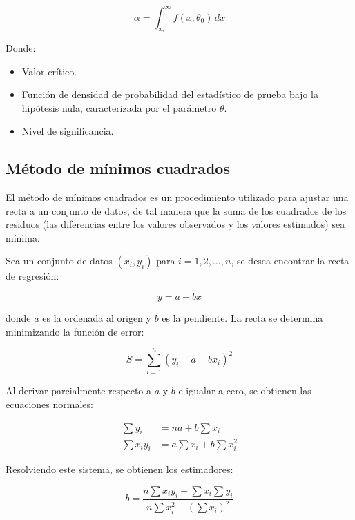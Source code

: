 \documentclass[twocolumn]{article} %
\begin{document}
\begin{equation}
    \alpha = \int_{x_*}^{\infty} f(x; \theta_0) \, dx 
\end{equation}

Donde:
\begin{itemize}
    \item[$x_*$:] Valor crítico.
    \item[$f(x;\theta)$:] Función de densidad de probabilidad del estadístico de prueba bajo la hipótesis nula, caracterizada por el parámetro $\theta$.
    \item[$\alpha$:] Nivel de significancia.
\end{itemize}



\subsection{Método de mínimos cuadrados}

El método de mínimos cuadrados es un procedimiento utilizado para ajustar una recta a un conjunto de datos, de tal manera que la suma de los cuadrados de los residuos (las diferencias entre los valores observados y los valores estimados) sea mínima.

Sea un conjunto de datos $(x_i, y_i)$ para $i = 1, 2, \dots, n$, se desea encontrar la recta de regresión:

\begin{equation}
    y = a + bx
\end{equation}

donde $a$ es la ordenada al origen y $b$ es la pendiente. La recta se determina minimizando la función de error:

\begin{equation}
    S = \sum_{i=1}^{n} (y_i - a - bx_i)^2
\end{equation}

Al derivar parcialmente respecto a $a$ y $b$ e igualar a cero, se obtienen las ecuaciones normales:

\begin{align}
    \sum y_i &= na + b \sum x_i \\
    \sum x_i y_i &= a \sum x_i + b \sum x_i^2
\end{align}

Resolviendo este sistema, se obtienen los estimadores:

\begin{equation}
    b = \frac{n \sum x_i y_i - \sum x_i \sum y_i}{n \sum x_i^2 - (\sum x_i)^2}
\end{equation}
\end{document}
